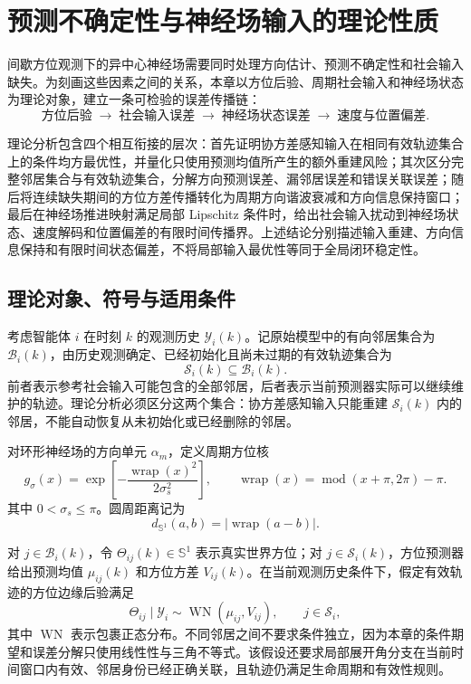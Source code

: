 \documentclass[UTF8,fontset=windows,11pt]{ctexart}
\newcommand{\Sone}{\mathbb S^1}
\begin{document}
\section{预测不确定性与神经场输入的理论性质}

间歇方位观测下的异中心神经场需要同时处理方向估计、预测不确定性和社会输入缺失。为刻画这些因素之间的关系，本章以方位后验、周期社会输入和神经场状态为理论对象，建立一条可检验的误差传播链：
\[
\text{方位后验}\;\longrightarrow\;\text{社会输入误差}\;\longrightarrow\;\text{神经场状态误差}\;\longrightarrow\;\text{速度与位置偏差}.
\]

理论分析包含四个相互衔接的层次：首先证明协方差感知输入在相同有效轨迹集合上的条件均方最优性，并量化只使用预测均值所产生的额外重建风险；其次区分完整邻居集合与有效轨迹集合，分解方向预测误差、漏邻居误差和错误关联误差；随后将连续缺失期间的方位方差传播转化为周期方向谐波衰减和方向信息保持窗口；最后在神经场推进映射满足局部 Lipschitz 条件时，给出社会输入扰动到神经场状态、速度解码和位置偏差的有限时间传播界。上述结论分别描述输入重建、方向信息保持和有限时间状态偏差，不将局部输入最优性等同于全局闭环稳定性。

\subsection{理论对象、符号与适用条件}

考虑智能体 $i$ 在时刻 $k$ 的观测历史 $\mathcal Y_i(k)$。记原始模型中的有向邻居集合为 $\mathcal B_i(k)$，由历史观测确定、已经初始化且尚未过期的有效轨迹集合为
\[
\mathcal S_i(k)\subseteq\mathcal B_i(k).
\]
前者表示参考社会输入可能包含的全部邻居，后者表示当前预测器实际可以继续维护的轨迹。理论分析必须区分这两个集合：协方差感知输入只能重建 $\mathcal S_i(k)$ 内的邻居，不能自动恢复从未初始化或已经删除的邻居。

对环形神经场的方向单元 $\alpha_m$，定义周期方位核
\begin{equation}
 g_\sigma(x)=\exp\!\left[-\frac{\operatorname{wrap}(x)^2}{2\sigma_s^2}\right],
 \qquad
 \operatorname{wrap}(x)=\operatorname{mod}(x+\pi,2\pi)-\pi .
 \label{eq:v2_kernel}
\end{equation}
其中 $0<\sigma_s\leq\pi$。圆周距离记为
\begin{equation}
 d_{\Sone}(a,b)=|\operatorname{wrap}(a-b)|.
 \label{eq:v2_circle_distance}
\end{equation}

对 $j\in\mathcal B_i(k)$，令 $\Theta_{ij}(k)\in\Sone$ 表示真实世界方位；对 $j\in\mathcal S_i(k)$，方位预测器给出预测均值 $\mu_{ij}(k)$ 和方位方差 $V_{ij}(k)$。在当前观测历史条件下，假定有效轨迹的方位边缘后验满足
\begin{equation}
 \Theta_{ij}\mid\mathcal Y_i\sim\operatorname{WN}(\mu_{ij},V_{ij}),
 \qquad j\in\mathcal S_i,
 \label{eq:v2_wn_assumption}
\end{equation}
其中 $\operatorname{WN}$ 表示包裹正态分布。不同邻居之间不要求条件独立，因为本章的条件期望和误差分解只使用线性性与三角不等式。该假设还要求局部展开角分支在当前时间窗口内有效、邻居身份已经正确关联，且轨迹仍满足生命周期和有效性规则。
\end{document}
